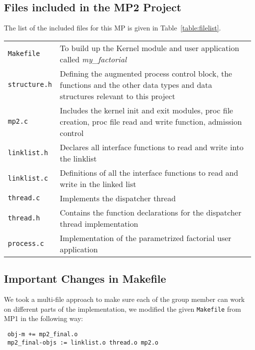 \documentclass[11pt]{article}
\begin{document}

\subsection{Files included in the MP2 Project}\label{subsec:Files}

The list of the included files for this MP is given in Table~\ref{table:filelist}.

\begin{table*}[h]
  \centering
  \rcow
  \caption{File list included in the project\label{table:filelist}}
  \begin{tabular}{|p{4cm}|p{8cm}|}
    {\tt Makefile}  &  To build up the Kernel module and user application called {\em my\_factorial}  \\
    {\tt structure.h} & Defining the augmented process control block, the functions and the other data types and data structures relevant to this project\\
    {\tt mp2.c}     &  Includes the kernel init and exit modules, proc file creation, proc file read and write function, admission control  \\
    {\tt linklist.h} & Declares all interface functions to read and write into the linklist\\
    {\tt linklist.c} & Definitions of all the interface functions to read and write in the linked list \\
    {\tt thread.c}  & Implements the dispatcher thread \\
    {\tt thread.h}  & Contains the function declarations for the dispatcher thread implementation \\
    {\tt process.c} & Implementation of the parametrized factorial user application \\
  \end{tabular}
\end{table*}

\subsection{Important Changes in Makefile}\label{subsec:Make}

We took a multi-file approach to make sure each of the group member can work on different parts of the implementation, we modified the given {\tt Makefile} from MP1 in the following way:

\begin{verbatim}
 obj-m += mp2_final.o
 mp2_final-objs := linklist.o thread.o mp2.o
\end{verbatim}
\end{document}
